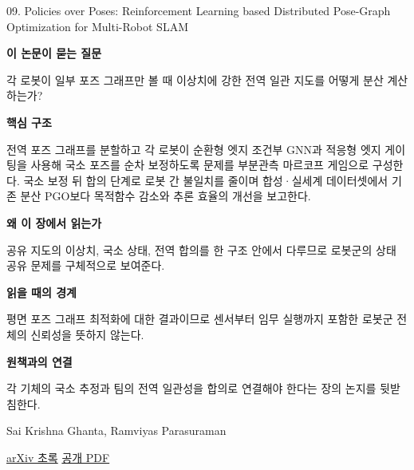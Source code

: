 \documentclass[11pt,openany]{book}
\begin{document}
\begin{termcard}{09. Policies over Poses: Reinforcement Learning based Distributed Pose-Graph Optimization for Multi-Robot SLAM}

\par

\medskip

{\sffamily\bfseries\color{deepblue} 이 논문이 묻는 질문}\par

각 로봇이 일부 포즈 그래프만 볼 때 이상치에 강한 전역 일관 지도를 어떻게 분산 계산하는가?

\smallskip

{\sffamily\bfseries\color{deepblue} 핵심 구조}\par

전역 포즈 그래프를 분할하고 각 로봇이 순환형 엣지 조건부 GNN과 적응형 엣지 게이팅을 사용해 국소 포즈를 순차 보정하도록 문제를 부분관측 마르코프 게임으로 구성한다. 국소 보정 뒤 합의 단계로 로봇 간 불일치를 줄이며 합성·실세계 데이터셋에서 기존 분산 PGO보다 목적함수 감소와 추론 효율의 개선을 보고한다.

\smallskip

{\sffamily\bfseries\color{deepblue} 왜 이 장에서 읽는가}\par

공유 지도의 이상치, 국소 상태, 전역 합의를 한 구조 안에서 다루므로 로봇군의 상태 공유 문제를 구체적으로 보여준다.

\smallskip

{\sffamily\bfseries\color{coral} 읽을 때의 경계}\par

평면 포즈 그래프 최적화에 대한 결과이므로 센서부터 임무 실행까지 포함한 로봇군 전체의 신뢰성을 뜻하지 않는다.

\smallskip

{\sffamily\bfseries\color{teal} 원책과의 연결}\par

각 기체의 국소 추정과 팀의 전역 일관성을 합의로 연결해야 한다는 장의 논지를 뒷받침한다.

\medskip

{\footnotesize\color{muted} Sai Krishna Ghanta, Ramviyas Parasuraman\par

\href{https://arxiv.org/abs/2510.22740}{arXiv 초록} \quad \href{https://arxiv.org/pdf/2510.22740}{공개 PDF}\par}

\end{termcard}
\end{document}

